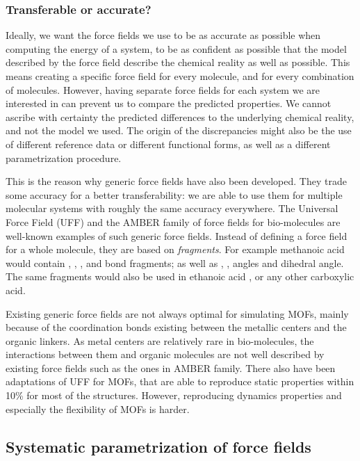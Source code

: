 \documentclass[thesis]{subfiles}
\begin{document}
\subsubsection{Transferable or accurate?}

Ideally, we want the force fields we use to be as accurate as possible when
computing the energy of a system, to be as confident as possible that the model
described by the force field describe the chemical reality as well as possible.
This means creating a specific force field for every molecule, and for every
combination of molecules. However, having separate force fields for each system
we are interested in can prevent us to compare the predicted properties. We cannot
ascribe with certainty the predicted differences to the underlying chemical
reality, and not the model we used. The origin of the discrepancies might also
be the use of different reference data or different functional forms, as well as
a different parametrization procedure.

This is the reason why generic force fields have also been developed. They
trade some accuracy for a better transferability: we are able to use them for
multiple molecular systems with roughly the same accuracy everywhere. The
Universal Force Field\cite{Rappe1992} (UFF) and the AMBER family\cite{Wang2004}
of force fields for bio-molecules are well-known examples of such generic force
fields. Instead of defining a force field for a whole molecule, they are based
on \emph{fragments}. For example methanoic acid  would contain
, , , and  bond fragments; as well as
, ,  angles and  dihedral angle. The
same fragments would also be used in ethanoic acid , or any other
carboxylic acid.

Existing generic force fields are not always optimal for simulating MOFs, mainly
because of the coordination bonds existing between the metallic centers and the
organic linkers. As metal centers are relatively rare in bio-molecules, the
interactions between them and organic molecules are not well described by
existing force fields such as the ones in AMBER family. There also have been
adaptations of UFF for MOFs\cite{Addicoat2014, Coupry2016}, that are able to
reproduce static properties within 10\% for most of the structures. However,
reproducing dynamics properties and especially the flexibility of MOFs is harder.

\subsection{Systematic parametrization of force fields}
\end{document}
